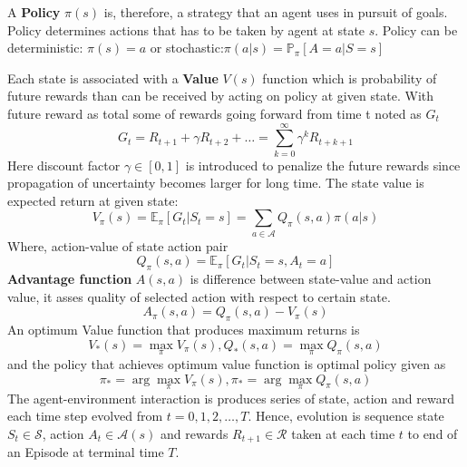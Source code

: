 \noindent A \textbf{\Gls{Policy}} $\pi(s)$  is, therefore, a strategy that an agent uses in pursuit of goals.\cite{russell2010artificial} Policy determines actions that has to be taken by agent at state $s$. Policy can be deterministic: $\pi(s)=a$ or stochastic:$\pi(a \vert s) = \mathbb{P}_\pi [A=a \vert S=s]$

Each state is associated with a \textbf{Value} $V(s)$ function which is probability of future rewards than can be received by acting on policy at given state. With future reward as total some of rewards going forward from time t noted as $G_t$
\begin{equation}
    G_t = R_{t+1} + \gamma R_{t+2} + \dots = \sum_{k=0}^{\infty} \gamma^k R_{t+k+1}
\end{equation}
Here discount factor $\gamma \in [0,1]$ is introduced to  penalize the future rewards since propagation of uncertainty becomes larger for long time. The state value is expected return at given state:
\begin{equation}
    V_{\pi}(s) = \mathbb{E}_{\pi}[G_t \vert S_t = s] = \sum_{a \in \mathcal{A}} Q_{\pi}(s, a) \pi(a \vert s)
\end{equation}
Where, action-value of state action pair
\begin{equation}
Q_{\pi}(s, a) = \mathbb{E}_{\pi}[G_t \vert S_t = s, A_t = a]    
\end{equation}
\textbf{\Gls{Advantage} function} $A(s,a)$ is difference between state-value and action value, it asses quality of selected action with respect to certain state.  
\begin{equation}
    A_{\pi}(s, a) = Q_{\pi}(s, a) - V_{\pi}(s)
\end{equation}
An optimum \Gls{Value} function that produces maximum returns is
\begin{equation}
    V_{*}(s) = \max_{\pi} V_{\pi}(s),
Q_{*}(s, a) = \max_{\pi} Q_{\pi}(s, a)
\end{equation}
and the policy that achieves optimum value function is optimal policy given as
\begin{equation}
    \pi_{*} = \arg\max_{\pi} V_{\pi}(s),
\pi_{*} = \arg\max_{\pi} Q_{\pi}(s, a)
\end{equation}
The agent-environment interaction is produces series of state, action and reward each time step evolved from $t=0,1,2,\dots,T$. Hence, evolution is sequence state $S_t \in \mathcal{S}$, action $A_t \in \mathcal{A}(s)$ and rewards $R_{t+1} \in \mathcal{R}$ taken at each time $t$ to end of an \gls{Episode} at terminal time $T$.
